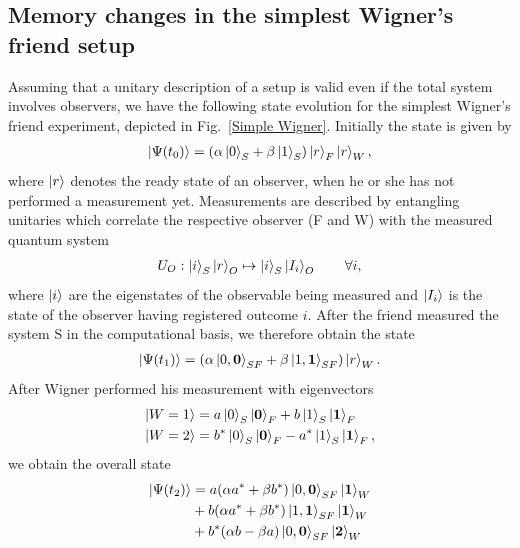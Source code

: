 \documentclass[a4paper,twocolumn,11pt,accepted=2017-05-09,dvipsnames]{quantumarticle}
\numberwithin{equation}{section}
\begin{document}



\newpage

\begin{appendix}

\section{Memory changes in the simplest Wigner's friend setup}
\label{app:Simple}

Assuming that a unitary description of a setup is valid even if the total system involves observers, we have the following state evolution for the simplest Wigner's friend experiment, depicted in Fig.~\ref{Simple Wigner}. Initially the state is given by
\begin{align}
\label{Psi0s}
\ket{\Psi(t_0)}=\left( \alpha \ket{0}_S+\beta \ket{1}_S\right)\ket{r}_F\ket{r}_W,
\end{align}
where $\ket{r}$ denotes the ready state of an observer, when he or she has not performed a measurement yet. Measurements are described by entangling unitaries which correlate the respective observer (F and W) with the measured quantum system
\begin{align}
\label{msm}
U_O: \ket{i}_S\ket{r}_O \mapsto  \ket{i}_S\ket{I_i}_O \qquad \forall i,
\end{align}
where $\ket{i}$ are the eigenstates of the observable being measured and $\ket{I_i}$ is the state of the observer having registered outcome $i$. After the friend measured the system S in the computational basis, we therefore obtain the state
\begin{align}
\label{Psi1s}
\ket{\Psi(t_1)}=\left( \alpha \ket{0,\bm 0}_{SF}+\beta \ket{1, \bm 1}_{SF}\right)\ket{r}_W.
\end{align}
After Wigner performed his measurement with eigenvectors
\begin{align}
\ket{W=1}&= a\ket{0}_S\ket{\bm0}_F+b\ket{1}_S\ket{\bm1}_F\\
\ket{W=2}&=b^*\ket{0}_S\ket{\bm0}_F-a^*\ket{1}_S\ket{\bm1}_F,
\end{align}
we obtain the overall state
\begin{align}
\label{Psi2s}
\ket{\Psi(t_2)}&= a(\alpha a^*+\beta b^*)\ket{0,\bm 0}_{SF}\ket{\bm1}_W \nonumber \\
	&+ b(\alpha a^*+\beta b^*)\ket{1,\bm 1}_{SF}\ket{\bm1}_W \nonumber \\
	&+b^*(\alpha b -  \beta a)\ket{0,\bm 0}_{SF}\ket{\bm2}_W \nonumber \\

\end{align}
\end{appendix}
\end{document}
